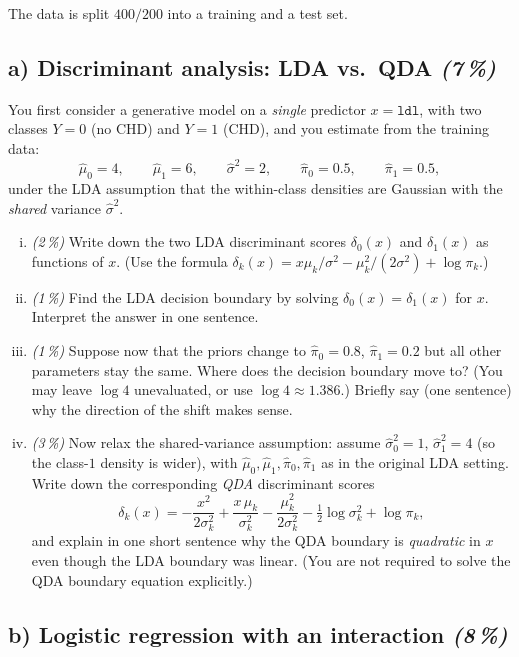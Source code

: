 \documentclass[11pt,a4paper]{article}
\newcommand{\subpoints}[1]{\textit{(#1\,\%)}}
\begin{document}
The data is split $400 / 200$ into a training and a test set.

\subsection*{a) Discriminant analysis: LDA vs.\ QDA \subpoints{7}}
You first consider a generative model on a \emph{single} predictor $x = \texttt{ldl}$, with two classes
$Y = 0$ (no CHD) and $Y = 1$ (CHD), and you estimate from the training data:
$$\hat\mu_0 = 4,\qquad \hat\mu_1 = 6,\qquad \hat\sigma^2 = 2,\qquad \hat\pi_0 = 0.5,\qquad \hat\pi_1 = 0.5,$$
under the LDA assumption that the within-class densities are Gaussian with the \emph{shared} variance $\hat\sigma^2$.

\begin{enumerate}[(i)]
  \item \subpoints{2} Write down the two LDA discriminant scores $\delta_0(x)$ and $\delta_1(x)$ as functions of $x$. (Use the formula $\delta_k(x) = x \mu_k/\sigma^2 - \mu_k^2/(2\sigma^2) + \log \pi_k$.)
  \item \subpoints{1} Find the LDA decision boundary by solving $\delta_0(x) = \delta_1(x)$ for $x$. Interpret the answer in one sentence.
  \item \subpoints{1} Suppose now that the priors change to $\hat\pi_0 = 0.8$, $\hat\pi_1 = 0.2$ but all other parameters stay the same. Where does the decision boundary move to? (You may leave $\log 4$ unevaluated, or use $\log 4 \approx 1.386$.) Briefly say (one sentence) why the direction of the shift makes sense.
  \item \subpoints{3} Now relax the shared-variance assumption: assume $\hat\sigma_0^2 = 1$, $\hat\sigma_1^2 = 4$ (so the class-$1$ density is wider), with $\hat\mu_0, \hat\mu_1, \hat\pi_0, \hat\pi_1$ as in the original LDA setting. Write down the corresponding \emph{QDA} discriminant scores
  $$\delta_k(x) = -\frac{x^2}{2\sigma_k^2} + \frac{x\,\mu_k}{\sigma_k^2} - \frac{\mu_k^2}{2\sigma_k^2} - \tfrac{1}{2}\log\sigma_k^2 + \log\pi_k,$$
  and explain in one short sentence why the QDA boundary is \emph{quadratic} in $x$ even though the LDA boundary was linear. (You are not required to solve the QDA boundary equation explicitly.)
\end{enumerate}

\subsection*{b) Logistic regression with an interaction \subpoints{8}}
\end{document}
